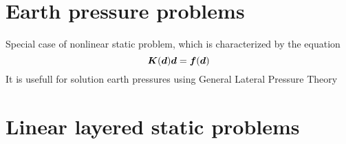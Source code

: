 \section{Earth pressure problems}
Special case of nonlinear static problem, which is characterized by the equation
\begin{equation}
\mbox{\boldmath$K$}(\mbox{\boldmath$d$}) \mbox{\boldmath$d$} = \mbox{\boldmath$f$}(\mbox{\boldmath$d$})
\end{equation}
It is usefull for solution earth pressures using General Lateral Pressure Theory
\section{Linear layered static problems}
